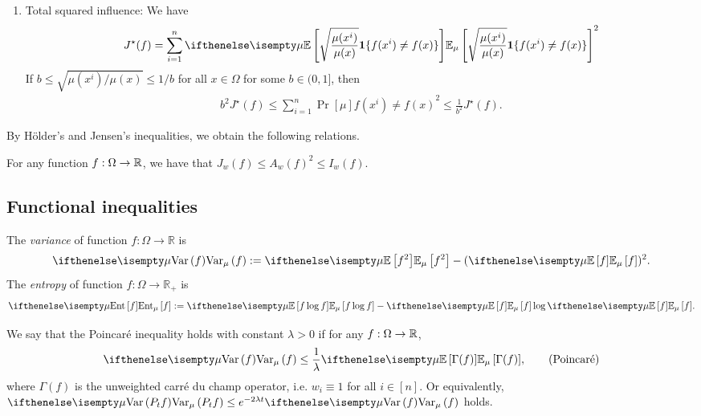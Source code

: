 \begin{example}
\begin{enumerate}[(1)]
        \item Total squared influence: We have
        \begin{align*}
            J^\star(f) = \sum_{i=1}^n \E[\mu]{\sqrt{\frac{\mu(x^i)}{\mu(x)}} \mathbf{1}\{f(x^i) \neq f(x)\}}^2
        \end{align*}
        If $b \le \sqrt{\mu(x^i)/\mu(x)} \le 1/b$ for all $x \in \Omega$ for some $b \in (0,1]$, then 
        \begin{align*}
            b^2J^\star(f) \le \sum_{i=1}^n \Pr[\mu]{f(x^i) \neq f(x)}^2 \le \frac 1{b^2}J^\star(f).
        \end{align*}
    \end{enumerate}
    
\end{example}

By H\"older’s and Jensen’s inequalities, we obtain the following relations.
\begin{fact}
    For any function $f : \Omega \to \mathbb{R}$, we have that $J_w(f)\leq A_w(f)^2 \leq I_w(f)$.
\end{fact}

\subsection{Functional inequalities}
\begin{definition}
    The \textit{variance} of function $f: \Omega \to \mathbb{R}$ is
    \begin{align*}
        \Var[\mu]{f} := \E[\mu]{f^2} - (\E[\mu]{f})^2.
    \end{align*}
    The \textit{entropy} of function $f: \Omega \to \mathbb{R}_+$ is
    \begin{align*}
        \Ent[\mu]{f} := \E[\mu]{f \log f} - \E[\mu]{f} \log \E[\mu]{f}.
    \end{align*}
\end{definition}

\begin{definition}
    We say that the Poincar\'e inequality holds with constant $\lambda > 0$ if for any $f: \Omega \to \mathbb{R}$,
    \begin{align}\label{eq:Poincare}
        \Var[\mu]{f} \leq \frac 1\lambda \E[\mu]{\Gamma (f)}, \tag{Poincar\'e}
    \end{align}
    where $\Gamma(f)$ is the unweighted carr\'e du champ operator, i.e. $w_i \equiv 1$ for all $i\in [n]$.
    Or equivalently, $\Var[\mu]{P_t f}\leq e^{-2\lambda t}\Var[\mu]{f}$ holds.
\end{definition}

